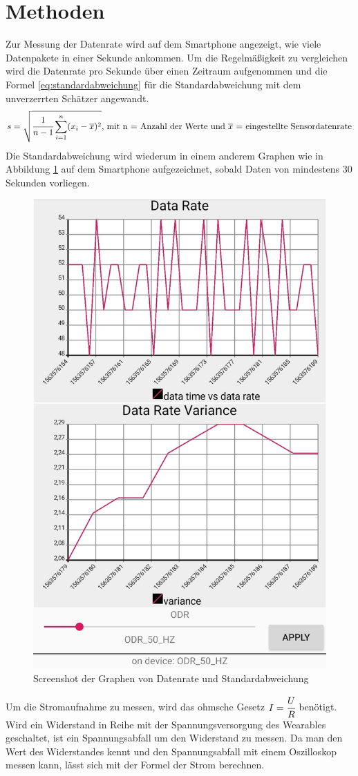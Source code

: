 \section{Methoden}
Zur Messung der Datenrate wird auf dem Smartphone angezeigt, wie viele Datenpakete in einer Sekunde ankommen.
Um die Regelmäßigkeit zu vergleichen wird die Datenrate pro Sekunde über einen Zeitraum aufgenommen und die Formel \ref{eq:standardabweichung} für die Standardabweichung mit dem unverzerrten Schätzer angewandt.
\begin{equation}
  \label{eq:standardabweichung}
	s = \sqrt{\cfrac{1}{n-1}\sum_{i=1}^{n} (x_{i}-\overline{x})^{2}}\text{, mit n = Anzahl der Werte und $\overline{x}$ = eingestellte Sensordatenrate}
\end{equation}
Die Standardabweichung wird wiederum in einem anderem Graphen wie in Abbildung \ref{fig:android} auf dem Smartphone aufgezeichnet, sobald Daten von mindestens 30 Sekunden vorliegen.\\
\begin{figure}[hbtp]
	\centering
	\includegraphics[width=0.5\linewidth]{res/android.jpg}
	\caption{Screenshot der Graphen von Datenrate und Standardabweichung}
	\label{fig:android}
\end{figure}
Um die Stromaufnahme zu messen, wird das ohmsche Gesetz $I = \cfrac{U}{R}$ benötigt.
Wird ein Widerstand in Reihe mit der Spannungsversorgung des Wearables geschaltet, ist ein Spannungsabfall um den Widerstand zu messen.
Da man den Wert des Widerstandes kennt und den Spannungsabfall mit einem Oszilloskop messen kann, lässt sich mit der Formel der Strom berechnen.
